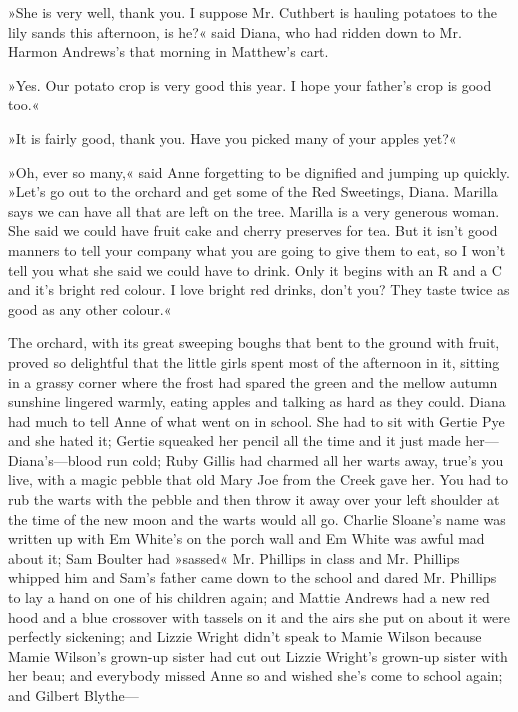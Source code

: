 »She is very well, thank you. I suppose Mr. Cuthbert is hauling potatoes to the lily sands this afternoon, is he?« said Diana, who had ridden down to Mr. Harmon Andrews's that morning in Matthew's cart.

»Yes. Our potato crop is very good this year. I hope your father's crop is good too.«

»It is fairly good, thank you. Have you picked many of your apples yet?«

»Oh, ever so many,« said Anne forgetting to be dignified and jumping up quickly. »Let's go out to the orchard and get some of the Red Sweetings, Diana. Marilla says we can have all that are left on the tree. Marilla is a very generous woman. She said we could have fruit cake and cherry preserves for tea. But it isn't good manners to tell your company what you are going to give them to eat, so I won't tell you what she said we could have to drink. Only it begins with an R and a C and it's bright red colour. I love bright red drinks, don't you? They taste twice as good as any other colour.«

The orchard, with its great sweeping boughs that bent to the ground with fruit, proved so delightful that the little girls spent most of the afternoon in it, sitting in a grassy corner where the frost had spared the green and the mellow autumn sunshine lingered warmly, eating apples and talking as hard as they could. Diana had much to tell Anne of what went on in school. She had to sit with Gertie Pye and she hated it; Gertie squeaked her pencil all the time and it just made her—Diana's—blood run cold; Ruby Gillis had charmed all her warts away, true's you live, with a magic pebble that old Mary Joe from the Creek gave her. You had to rub the warts with the pebble and then throw it away over your left shoulder at the time of the new moon and the warts would all go. Charlie Sloane's name was written up with Em White's on the porch wall and Em White was awful mad about it; Sam Boulter had »sassed« Mr. Phillips in class and Mr. Phillips whipped him and Sam's father came down to the school and dared Mr. Phillips to lay a hand on one of his children again; and Mattie Andrews had a new red hood and a blue crossover with tassels on it and the airs she put on about it were perfectly sickening; and Lizzie Wright didn't speak to Mamie Wilson because Mamie Wilson's grown-up sister had cut out Lizzie Wright's grown-up sister with her beau; and everybody missed Anne so and wished she's come to school again; and Gilbert Blythe—

